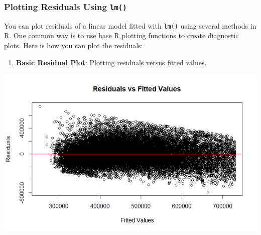 \documentclass[
]{book}
\newenvironment{Shaded}{\begin{snugshade}}{\end{snugshade}}
\newcommand{\AttributeTok}[1]{\textcolor[rgb]{0.13,0.29,0.53}{#1}}
\newcommand{\CommentTok}[1]{\textcolor[rgb]{0.56,0.35,0.01}{\textit{#1}}}
\newcommand{\DecValTok}[1]{\textcolor[rgb]{0.00,0.00,0.81}{#1}}
\newcommand{\FunctionTok}[1]{\textcolor[rgb]{0.13,0.29,0.53}{\textbf{#1}}}
\newcommand{\NormalTok}[1]{#1}
\newcommand{\OtherTok}[1]{\textcolor[rgb]{0.56,0.35,0.01}{#1}}
\newcommand{\SpecialCharTok}[1]{\textcolor[rgb]{0.81,0.36,0.00}{\textbf{#1}}}
\newcommand{\StringTok}[1]{\textcolor[rgb]{0.31,0.60,0.02}{#1}}
\providecommand{\tightlist}{%
  \setlength{\itemsep}{0pt}\setlength{\parskip}{0pt}}
\begin{document}
\hypertarget{plotting-residuals-using-lm}{%
\subsubsection*{\texorpdfstring{Plotting Residuals Using \texttt{lm()}}{Plotting Residuals Using lm()}}\label{plotting-residuals-using-lm}}

You can plot residuals of a linear model fitted with \texttt{lm()} using several methods in R. One common way is to use base R plotting functions to create diagnostic plots. Here is how you can plot the residuals:

\begin{enumerate}
\def\labelenumi{\arabic{enumi}.}
\tightlist
\item
  \textbf{Basic Residual Plot}: Plotting residuals versus fitted values.
\end{enumerate}

\begin{Shaded}
\end{Shaded}

\includegraphics{images/residual_plot.PNG}
\end{document}
